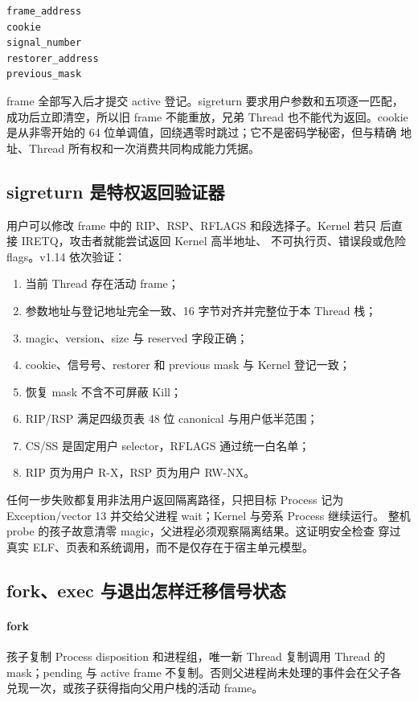 \begin{lstlisting}
frame_address
cookie
signal_number
restorer_address
previous_mask
\end{lstlisting}

frame 全部写入后才提交 active 登记。sigreturn 要求用户参数和五项逐一匹配，
成功后立即清空，所以旧 frame 不能重放，兄弟 Thread 也不能代为返回。cookie
是从非零开始的 64 位单调值，回绕遇零时跳过；它不是密码学秘密，但与精确
地址、Thread 所有权和一次消费共同构成能力凭据。

\subsection{sigreturn 是特权返回验证器}

用户可以修改 frame 中的 RIP、RSP、RFLAGS 和段选择子。Kernel 若只
 后直接 IRETQ，攻击者就能尝试返回 Kernel 高半地址、
不可执行页、错误段或危险 flags。v1.14 依次验证：

\begin{enumerate}
  \item 当前 Thread 存在活动 frame；
  \item 参数地址与登记地址完全一致、16 字节对齐并完整位于本 Thread 栈；
  \item magic、version、size 与 reserved 字段正确；
  \item cookie、信号号、restorer 和 previous mask 与 Kernel 登记一致；
  \item 恢复 mask 不含不可屏蔽 Kill；
  \item RIP/RSP 满足四级页表 48 位 canonical 与用户低半范围；
  \item CS/SS 是固定用户 selector，RFLAGS 通过统一白名单；
  \item RIP 页为用户 R-X，RSP 页为用户 RW-NX。
\end{enumerate}

任何一步失败都复用非法用户返回隔离路径，只把目标 Process 记为
Exception/vector 13 并交给父进程 wait；Kernel 与旁系 Process 继续运行。
整机 probe 的孩子故意清零 magic，父进程必须观察隔离结果。这证明安全检查
穿过真实 ELF、页表和系统调用，而不是仅存在于宿主单元模型。

\subsection{fork、exec 与退出怎样迁移信号状态}

\paragraph{fork}
孩子复制 Process disposition 和进程组，唯一新 Thread 复制调用 Thread 的
mask；pending 与 active frame 不复制。否则父进程尚未处理的事件会在父子各
兑现一次，或孩子获得指向父用户栈的活动 frame。

